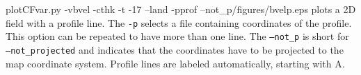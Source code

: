 \begin{pycf}{plotCFvar.py -vbvel -cthk -t -17 --land -pprof --not\_p}{\dir/figures/bvelp.eps}
plots a 2D field with a profile line. The \texttt{-p} selects a file containing coordinates of the profile. This option can be repeated to have more than one line. The \texttt{--not\_p} is short for \texttt{--not\_projected} and indicates that the coordinates have to be projected to the map coordinate system. Profile lines are labeled automatically, starting with A.
\end{pycf}
